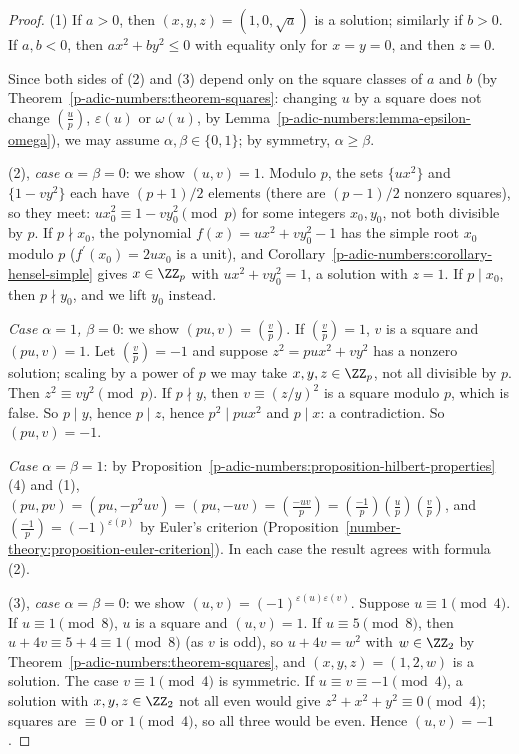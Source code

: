 \begin{proof}
(1) If $a > 0$, then $(x, y, z) = (1, 0, \sqrt a)$ is a solution; similarly if $b > 0$. If $a, b < 0$, then $ax^2 + by^2 \leq 0$ with equality only for $x = y = 0$, and then
$z = 0$.

Since both sides of (2) and (3) depend only on the square classes of $a$ and $b$ (by Theorem~\ref{p-adic-numbers:theorem-squares}: changing $u$ by a square does not change $(\frac up)$, $\varepsilon(u)$ or
$\omega(u)$, by Lemma~\ref{p-adic-numbers:lemma-epsilon-omega}), we may assume $\alpha, \beta \in \{0, 1\}$; by symmetry, $\alpha \geq \beta$.

(2), \emph{case $\alpha = \beta = 0$}: we show $(u, v) = 1$. Modulo $p$, the sets $\{ux^2\}$ and $\{1 - vy^2\}$ each have $(p + 1)/2$ elements (there are $(p - 1)/2$ nonzero squares), so they meet:
$ux_0^2 \equiv 1 - vy_0^2 \pmod p$ for some integers $x_0, y_0$, not both divisible by $p$. If $p \nmid x_0$, the polynomial $f(x) = ux^2 + vy_0^2 - 1$ has the simple root $x_0$ modulo $p$
($f^{\prime}(x_0) = 2ux_0$ is a unit), and Corollary~\ref{p-adic-numbers:corollary-hensel-simple} gives $x \in \ZZ_p$ with $ux^2 + vy_0^2 = 1$, a solution with $z = 1$. If $p \mid x_0$, then $p \nmid y_0$, and
we lift $y_0$ instead.

\emph{Case $\alpha = 1$, $\beta = 0$}: we show $(pu, v) = (\frac vp)$. If $(\frac vp) = 1$, $v$ is a square and $(pu, v) = 1$. Let $(\frac vp) = -1$ and suppose $z^2 = pux^2 + vy^2$ has a nonzero solution;
scaling by a power of $p$ we may take $x, y, z \in \ZZ_p$, not all divisible by $p$. Then $z^2 \equiv vy^2 \pmod p$. If $p \nmid y$, then $v \equiv (z/y)^2$ is a square modulo $p$, which is false. So $p \mid y$,
hence $p \mid z$, hence $p^2 \mid pux^2$ and $p \mid x$: a contradiction. So $(pu, v) = -1$.

\emph{Case $\alpha = \beta = 1$}: by Proposition~\ref{p-adic-numbers:proposition-hilbert-properties}(4) and (1), $(pu, pv) = (pu, -p^2uv) = (pu, -uv) = (\frac{-uv}{p}) = (\frac{-1}{p})(\frac up)(\frac vp)$, and
$(\frac{-1}{p}) = (-1)^{\varepsilon(p)}$ by Euler's criterion (Proposition~\ref{number-theory:proposition-euler-criterion}). In each case the result agrees with formula (2).

(3), \emph{case $\alpha = \beta = 0$}: we show $(u, v) = (-1)^{\varepsilon(u)\varepsilon(v)}$. Suppose $u \equiv 1 \pmod 4$. If $u \equiv 1 \pmod 8$, $u$ is a square and $(u, v) = 1$. If $u \equiv 5 \pmod 8$, then
$u + 4v \equiv 5 + 4 \equiv 1 \pmod 8$ (as $v$ is odd), so $u + 4v = w^2$ with $w \in \ZZ_2$ by Theorem~\ref{p-adic-numbers:theorem-squares}, and $(x, y, z) = (1, 2, w)$ is a solution. The case
$v \equiv 1 \pmod 4$ is symmetric. If $u \equiv v \equiv -1 \pmod 4$, a solution with $x, y, z \in \ZZ_2$ not all even would give $z^2 + x^2 + y^2 \equiv 0 \pmod 4$; squares are $\equiv 0$ or $1 \pmod 4$, so all three
would be even. Hence $(u, v) = -1$.


\end{proof}
